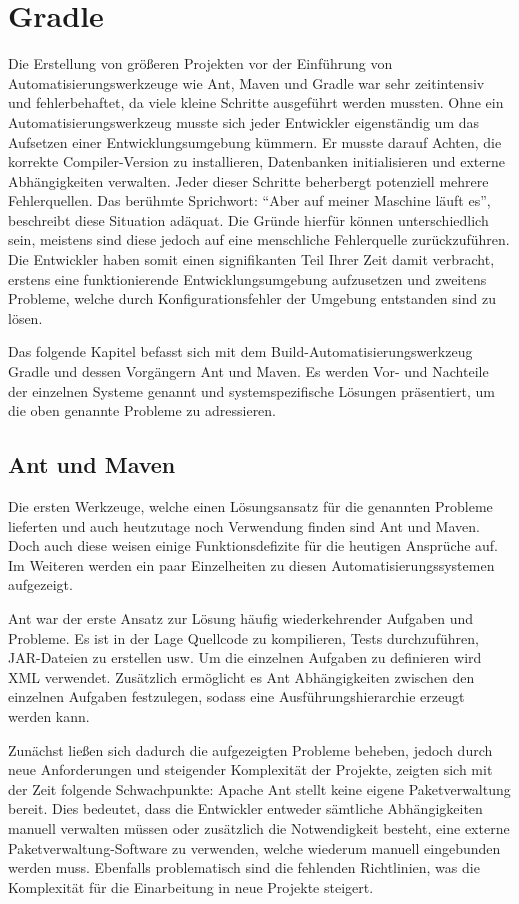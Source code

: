 
\section{Gradle}
\label{ch-gradle}
Die Erstellung von größeren Projekten vor der Einführung von Automatisierungswerkzeuge wie Ant, Maven und Gradle war sehr zeitintensiv und fehlerbehaftet, da viele kleine Schritte ausgeführt werden mussten.
Ohne ein Automatisierungswerkzeug musste sich jeder Entwickler eigenständig um das Aufsetzen einer Entwicklungsumgebung kümmern. 
Er musste darauf Achten, die korrekte Compiler-Version zu installieren, Datenbanken initialisieren und externe Abhängigkeiten verwalten.
Jeder dieser Schritte beherbergt potenziell mehrere Fehlerquellen.
Das berühmte Sprichwort: \enquote{Aber auf meiner Maschine läuft es}, beschreibt diese Situation adäquat.
Die Gründe hierfür können unterschiedlich sein, meistens sind diese jedoch auf eine menschliche Fehlerquelle zurückzuführen.
Die Entwickler haben somit einen signifikanten Teil Ihrer Zeit damit verbracht, erstens eine funktionierende Entwicklungsumgebung aufzusetzen und zweitens Probleme, welche durch Konfigurationsfehler der Umgebung entstanden sind zu lösen.

Das folgende Kapitel befasst sich mit dem Build-Automatisierungswerkzeug Gradle und dessen Vorgängern Ant und Maven. Es werden Vor- und Nachteile der einzelnen Systeme genannt und systemspezifische Lösungen präsentiert, um die oben genannte Probleme zu adressieren.


\subsection{Ant und Maven}
Die ersten Werkzeuge, welche einen Lösungsansatz für die genannten Probleme lieferten und auch heutzutage noch Verwendung finden sind Ant und Maven.
Doch auch diese weisen einige Funktionsdefizite für die heutigen Ansprüche auf.
Im Weiteren werden ein paar Einzelheiten zu diesen Automatisierungssystemen aufgezeigt.

Ant war der erste Ansatz zur Lösung häufig wiederkehrender Aufgaben und Probleme.
Es ist in der Lage Quellcode zu kompilieren, Tests durchzuführen, JAR-Dateien zu erstellen usw.
Um die einzelnen Aufgaben zu definieren wird XML verwendet.
Zusätzlich ermöglicht es Ant Abhängigkeiten zwischen den einzelnen Aufgaben festzulegen, sodass eine Ausführungshierarchie erzeugt werden kann.

Zunächst ließen sich dadurch die aufgezeigten Probleme beheben, jedoch durch neue Anforderungen und steigender Komplexität der Projekte, zeigten sich mit der Zeit folgende Schwachpunkte:
Apache Ant stellt keine eigene Paketverwaltung bereit. 
Dies bedeutet, dass die Entwickler entweder sämtliche Abhängigkeiten manuell verwalten müssen oder zusätzlich die Notwendigkeit besteht, eine externe Paketverwaltung-Software zu verwenden, welche wiederum manuell eingebunden werden muss.
Ebenfalls problematisch sind die fehlenden Richtlinien, was die Komplexität für die Einarbeitung in neue Projekte steigert.

